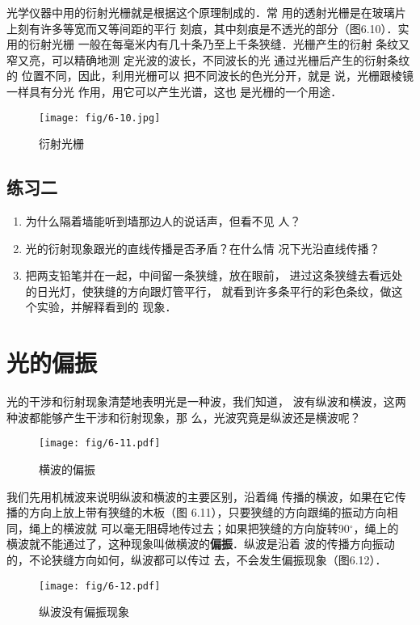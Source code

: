 光学仪器中用的衍射光栅就是根据这个原理制成的．常
用的透射光栅是在玻璃片上刻有许多等宽而又等间距的平行
刻痕，其中刻痕是不透光的部分（图6.10）．实用的衍射光栅
一般在每毫米内有几十条乃至上千条狭缝．光栅产生的衍射
条纹又窄又亮，可以精确地测
定光波的波长，不同波长的光
通过光栅后产生的衍射条纹的
位置不同，因此，利用光栅可以
把不同波长的色光分开，就是
说，光栅跟棱镜一样具有分光
作用，用它可以产生光谱，这也
是光栅的一个用途．
\begin{figure}[htp]\centering
    \texttt{[image: fig/6-10.jpg]}
    \caption{衍射光栅}
    \end{figure}

\subsection*{练习二}
\begin{enumerate}
\item 为什么隔着墙能听到墙那边人的说话声，但看不见
人？
\item 光的衍射现象跟光的直线传播是否矛盾？在什么情
况下光沿直线传播？
\item 把两支铅笔并在一起，中间留一条狭缝，放在眼前，
进过这条狭缝去看远处的日光灯，使狭缝的方向跟灯管平行，
就看到许多条平行的彩色条纹，做这个实验，并解释看到的
现象．
\end{enumerate}

\section{光的偏振}

光的干涉和衍射现象清楚地表明光是一种波，我们知道，
波有纵波和横波，这两种波都能够产生干涉和衍射现象，那
么，光波究竟是纵波还是横波呢？
\begin{figure}[htp]\centering
    \texttt{[image: fig/6-11.pdf]}
    \caption{横波的偏振}
    \end{figure}

我们先用机械波来说明纵波和横波的主要区别，沿着绳
传播的横波，如果在它传播的方向上放上带有狭缝的木板（图
6.11），只要狭缝的方向跟绳的振动方向相同，绳上的横波就
可以毫无阻碍地传过去；如果把狭缝的方向旋转90$^\circ$，绳上的
横波就不能通过了，这种现象叫做横波的\textbf{偏振}．纵波是沿着
波的传播方向振动的，不论狭缝方向如何，纵波都可以传过
去，不会发生偏振现象（图6.12）．
\begin{figure}[htp]\centering
    \texttt{[image: fig/6-12.pdf]}
    \caption{纵波没有偏振现象}
    \end{figure}

